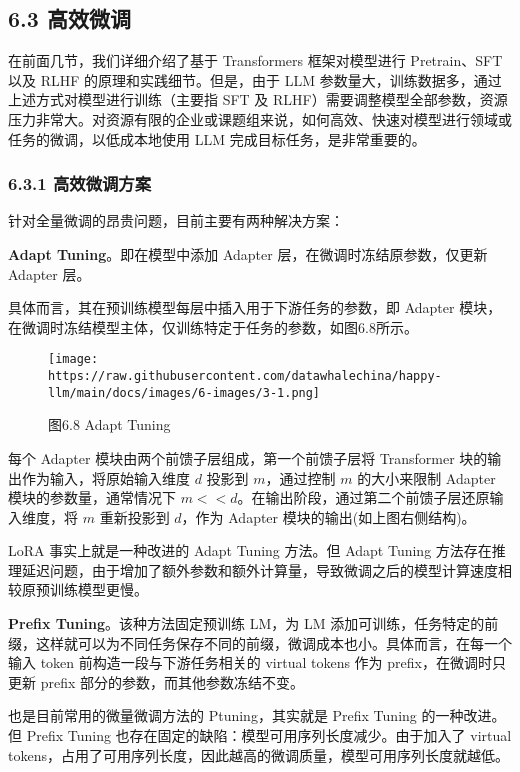 \documentclass[
]{article}
\begin{document}
\subsection{6.3 高效微调}\label{ux9ad8ux6548ux5faeux8c03}

在前面几节，我们详细介绍了基于 Transformers 框架对模型进行 Pretrain、SFT
以及 RLHF 的原理和实践细节。但是，由于 LLM
参数量大，训练数据多，通过上述方式对模型进行训练（主要指 SFT 及
RLHF）需要调整模型全部参数，资源压力非常大。对资源有限的企业或课题组来说，如何高效、快速对模型进行领域或任务的微调，以低成本地使用
LLM 完成目标任务，是非常重要的。

\subsubsection{6.3.1
高效微调方案}\label{ux9ad8ux6548ux5faeux8c03ux65b9ux6848}

针对全量微调的昂贵问题，目前主要有两种解决方案：

\textbf{Adapt Tuning}。即在模型中添加 Adapter
层，在微调时冻结原参数，仅更新 Adapter 层。

具体而言，其在预训练模型每层中插入用于下游任务的参数，即 Adapter
模块，在微调时冻结模型主体，仅训练特定于任务的参数，如图6.8所示。

\begin{figure}[htbp]\centering
\texttt{[image: https://raw.githubusercontent.com/datawhalechina/happy-llm/main/docs/images/6-images/3-1.png]}
\caption{图6.8 Adapt Tuning}
\end{figure}

每个 Adapter 模块由两个前馈子层组成，第一个前馈子层将 Transformer
块的输出作为输入，将原始输入维度 \(d\) 投影到 \(m\)，通过控制 \(m\)
的大小来限制 Adapter 模块的参数量，通常情况下
\(m << d\)。在输出阶段，通过第二个前馈子层还原输入维度，将 \(m\)
重新投影到 \(d\)，作为 Adapter 模块的输出(如上图右侧结构)。

LoRA 事实上就是一种改进的 Adapt Tuning 方法。但 Adapt Tuning
方法存在推理延迟问题，由于增加了额外参数和额外计算量，导致微调之后的模型计算速度相较原预训练模型更慢。

\textbf{Prefix Tuning}。该种方法固定预训练 LM，为 LM
添加可训练，任务特定的前缀，这样就可以为不同任务保存不同的前缀，微调成本也小。具体而言，在每一个输入
token 前构造一段与下游任务相关的 virtual tokens 作为
prefix，在微调时只更新 prefix 部分的参数，而其他参数冻结不变。

也是目前常用的微量微调方法的 Ptuning，其实就是 Prefix Tuning
的一种改进。但 Prefix Tuning
也存在固定的缺陷：模型可用序列长度减少。由于加入了 virtual
tokens，占用了可用序列长度，因此越高的微调质量，模型可用序列长度就越低。
\end{document}
